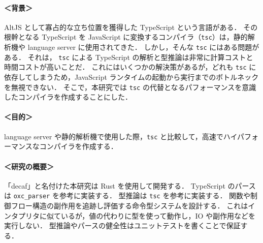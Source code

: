 \documentclass[dvipdfmx]{classes/tyukan}
\begin{document}
\paragraph{＜背景＞}
AltJS として寡占的な立ち位置を獲得した TypeScript という言語がある．
その根幹となる TypeScript を JavaScript に変換するコンパイラ（\texttt{tsc}）は，静的解析機や language server に使用されてきた．
しかし，そんな \texttt{tsc} にはある問題がある．
それは， \texttt{tsc} による TypeScript の解析と型推論は非常に計算コストと時間コストが高いことだ．
これにはいくつかの解決策があるが，どれも \texttt{tsc} に依存してしまうため，JavaScript ランタイムの起動から実行までのボトルネックを無視できない．
そこで，本研究では \texttt{tsc} の代替となるパフォーマンスを意識したコンパイラを作成することにした．

\paragraph{＜目的＞}
language server や静的解析機で使用した際，\texttt{tsc} と比較して，高速でハイパフォーマンスなコンパイラを作成する．

\paragraph{＜研究の概要＞}
「decaf」と名付けた本研究は Rust を使用して開発する．
TypeScript のパースは \texttt{oxc\_parser} を参考に実装する．
型推論は \texttt{tsc} を参考に実装する．
関数や制御フロー構造の副作用を追跡し評価する命令型システムを設計する．
これはインタプリタに似ているが，値の代わりに型を使って動作し，IO や副作用などを実行しない．
型推論やパースの健全性はユニットテストを書くことで保証する．
\end{document}
